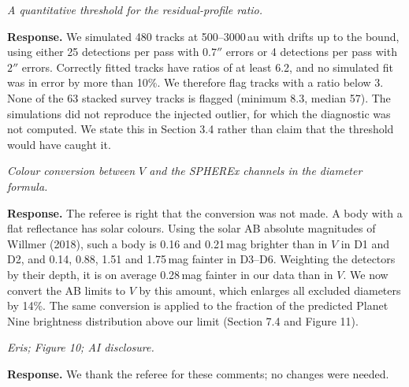\documentclass[11pt]{article}
\newenvironment{referee}{\par\color{black!60}\itshape}{\par}
\newcommand{\resp}{\par\noindent\textbf{Response.} }
\begin{document}
\begin{referee}
A quantitative threshold for the residual-profile ratio.
\end{referee}
\resp We simulated 480 tracks at 500--3000\,au with drifts up to the bound, using either 25 detections per pass with $0.7''$ errors or 4 detections per pass with $2''$ errors. Correctly fitted tracks have ratios of at least 6.2, and no simulated fit was in error by more than 10\%. We therefore flag tracks with a ratio below 3. None of the 63 stacked survey tracks is flagged (minimum 8.3, median 57). The simulations did not reproduce the injected outlier, for which the diagnostic was not computed. We state this in Section 3.4 rather than claim that the threshold would have caught it.

\begin{referee}
Colour conversion between $V$ and the SPHEREx channels in the diameter formula.
\end{referee}
\resp The referee is right that the conversion was not made. A body with a flat reflectance has solar colours. Using the solar AB absolute magnitudes of Willmer (2018), such a body is 0.16 and 0.21\,mag brighter than in $V$ in D1 and D2, and 0.14, 0.88, 1.51 and 1.75\,mag fainter in D3--D6. Weighting the detectors by their depth, it is on average 0.28\,mag fainter in our data than in $V$. We now convert the AB limits to $V$ by this amount, which enlarges all excluded diameters by 14\%. The same conversion is applied to the fraction of the predicted Planet Nine brightness distribution above our limit (Section 7.4 and Figure 11).

\begin{referee}
Eris; Figure 10; AI disclosure.
\end{referee}
\resp We thank the referee for these comments; no changes were needed.
\end{document}
